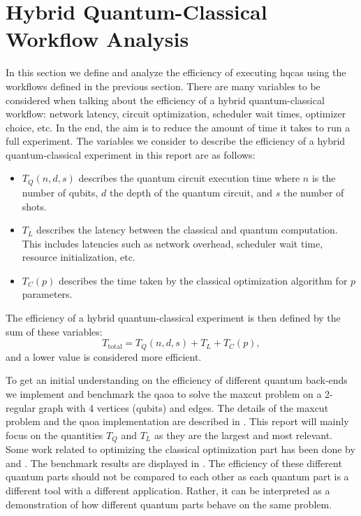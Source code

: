 \section{Hybrid Quantum-Classical Workflow Analysis}
In this section we define and analyze the efficiency of executing \glspl{hqca} using the workflows defined in the previous section.
There are many variables to be considered when talking about the efficiency of a hybrid quantum-classical workflow: network latency, circuit optimization, scheduler wait times, optimizer choice, etc.
In the end, the aim is to reduce the amount of time it takes to run a full experiment.
The variables we consider to describe the efficiency of a hybrid quantum-classical experiment in this report are as follows:
\begin{itemize}
    \item $T_Q(n, d, s)$ describes the quantum circuit execution time where $n$ is the number of qubits, $d$ the depth of the quantum circuit, and $s$ the number of shots.
    \item $T_L$ describes the latency between the classical and quantum computation. This includes latencies such as network overhead, scheduler wait time, resource initialization, etc.
    \item $T_C(p)$ describes the time taken by the classical optimization algorithm for $p$ parameters.
\end{itemize}
The efficiency of a hybrid quantum-classical experiment is then defined by the sum of these variables:
\begin{equation}
T_\text{total} = T_Q(n, d, s) + T_L + T_C(p),
\end{equation}
and a lower value is considered more efficient.

To get an initial understanding on the efficiency of different quantum back-ends we implement and benchmark the \gls{qaoa} to solve the \gls{maxcut} problem on a 2-regular graph with 4 vertices (qubits) and edges.
The details of the \gls{maxcut} problem and the \gls{qaoa} implementation are described in .
This report will mainly focus on the quantities $T_Q$ and $T_L$ as they are the largest and most relevant.
Some work related to optimizing the classical optimization part has been done by \textcite{lavrijsen2020classical} and \textcite{sung2020exploration}.
The benchmark results are displayed in .
The efficiency of these different quantum parts should not be compared to each other as each quantum part is a different tool with a different application.
Rather, it can be interpreted as a demonstration of how different quantum parts behave on the same problem.


